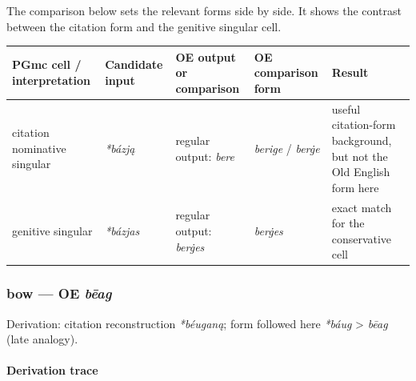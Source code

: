 \documentclass[
  british,
  a4paper,
]{article}
\newcounter{none} %
\begin{document}
The comparison below sets the relevant forms side by side. It shows the
contrast between the citation form and the genitive singular cell.

{\def\LTcaptype{none} %
\begin{longtable}[]{@{}
  >{\raggedright\arraybackslash}p{}
  >{\raggedright\arraybackslash}p{}
  >{\raggedright\arraybackslash}p{}
  >{\raggedright\arraybackslash}p{}
  >{\raggedright\arraybackslash}p{}@{}}
\toprule\noalign{}
\begin{minipage}[b]{\linewidth}\raggedright
PGmc cell / interpretation
\end{minipage} & \begin{minipage}[b]{\linewidth}\raggedright
Candidate input
\end{minipage} & \begin{minipage}[b]{\linewidth}\raggedright
OE output or comparison
\end{minipage} & \begin{minipage}[b]{\linewidth}\raggedright
OE comparison form
\end{minipage} & \begin{minipage}[b]{\linewidth}\raggedright
Result
\end{minipage} \\
\midrule\noalign{}
\endhead
\bottomrule\noalign{}
\endlastfoot
citation nominative singular & {\emph{*bázją}} & regular output:
{\emph{bere}} & {\emph{berige}} / {\emph{berġe}} & useful citation-form
background, but not the Old English form here \\
genitive singular & {\emph{*bázjas}} & regular output: \emph{berġes} &
{\emph{berġes}} & exact match for the conservative cell \\
\end{longtable}
}

\subsubsection{\texorpdfstring{bow --- OE
\emph{bēag}}{bow --- OE bēag}}\label{bow-oe-bux113ag}

Derivation: citation reconstruction \emph{*béuganą}; form followed here
\emph{*báug} \textgreater{} \emph{bēag} (late analogy).

\paragraph{Derivation trace}\label{derivation-trace-124}
\end{document}
